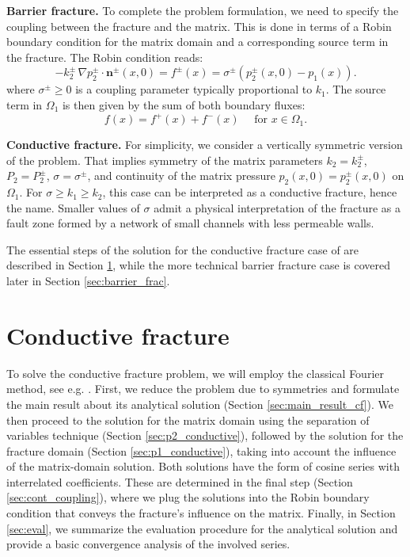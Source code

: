 \documentclass[sn-mathphys,Numbered]{sn-jnl}
\def\grad{\nabla}
\def\vc#1{\mathbf{\boldsymbol{#1}}}     %
\begin{document}
{\bf Barrier fracture.} 
To complete the problem formulation, we need to specify the coupling between the fracture and the matrix. This is done in terms of a Robin boundary condition for the matrix domain and a corresponding source term in the fracture. The Robin condition reads:
\begin{equation}
\label{eq:barrier_robin}
- k_2^\pm\, \grad p_2^\pm\cdot \vc n^\pm(x,0) 
  = f^\pm(x) =\sigma^\pm (p^\pm_2(x,0) - p_1(x)).
\end{equation}
where $\sigma^\pm \ge 0$ is a coupling parameter typically  proportional to $k_1$. 
The source term in $\Omega_1$ is then given by the sum of both boundary fluxes:
\begin{equation}
\label{eq:barrier_source}
f(x) = f^+(x) + f^-(x) \quad \text{ for }x\in\Omega_1.
\end{equation}


{\bf Conductive fracture.} For simplicity, we consider a vertically symmetric version of the problem. That implies symmetry of the matrix parameters $k_2 = k_2^\pm$, $P_2 =P_2^\pm$,  $\sigma = \sigma^\pm$, and continuity of the matrix pressure $p_2(x, 0) = p_2^\pm(x, 0)$ on $\Omega_1$. For $\sigma \ge k_1 \ge k_2$, this case can be interpreted as a conductive fracture, hence the name. Smaller values of $\sigma$ admit a physical interpretation of the fracture as  a fault zone formed by a network of small channels with less permeable walls.

The essential steps of the solution for the conductive fracture case of are described in Section \ref{sec:continuous_frac}, while the more technical  barrier fracture case is covered later in Section \ref{sec:barrier_frac}. 

\section{Conductive fracture}
\label{sec:continuous_frac}
To solve the conductive fracture problem, we will employ the classical Fourier method, see e.g. \cite{Brown1993}. 
First, we reduce the problem due to symmetries and formulate the main result about its analytical solution (Section \ref{sec:main_result_cf}). We then proceed to the solution for the matrix domain using the separation of variables technique (Section \ref{sec:p2_conductive}), followed by the solution for the fracture domain (Section \ref{sec:p1_conductive}), taking into account the influence of the matrix-domain solution. Both solutions have the form of cosine series with interrelated coefficients. These are determined in the final step (Section \ref{sec:cont_coupling}), where we plug the solutions into the Robin boundary condition that conveys the fracture's influence on the matrix. Finally, in Section \ref{sec:eval}, we summarize the evaluation procedure for the analytical solution and provide a basic convergence analysis of the involved series.
\end{document}
